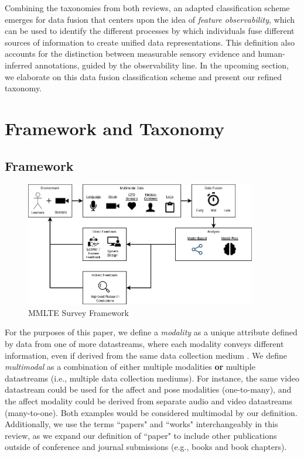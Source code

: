 \documentclass[manuscript,screen,review]{acmart}
\begin{document}
Combining the taxonomies from both reviews, an adapted classification scheme emerges for data fusion that centers upon the idea of \textit{feature observability}, which can be used to identify the different processes by which individuals fuse different sources of information to create unified data representations. This definition also accounts for the distinction between measurable sensory evidence and human-inferred annotations, guided by the observability line. In the upcoming section, we elaborate on this data fusion classification scheme and present our refined taxonomy.

\section{Framework and Taxonomy}

\subsection{Framework} \label{sec:framework}

\begin{figure}[htbp]
    \centering
    \includegraphics[width=0.9\textwidth]{img/MMLTE_Framework.png}
    \caption{MMLTE Survey Framework}
    \label{fig:framework}
\end{figure}



For the purposes of this paper, we define a \textit{modality} as a unique attribute defined by data from one of more datastreams, where each modality conveys different information, even if derived from the same data collection medium \cite{ochoa2017multimodal}. We define \textit{multimodal} as a combination of either multiple modalities \textbf{or} multiple datastreams (i.e., multiple data collection mediums). For instance, the same video datastream could be used for the affect and pose modalities (one-to-many), and the affect modality could be derived from separate audio and video datastreams (many-to-one). Both examples would be considered multimodal by our definition. Additionally, we use the terms ``papers" and ``works" interchangeably in this review, as we expand our definition of ``paper" to include other publications outside of conference and journal submissions (e.g., books and book chapters).
 
\end{document}
